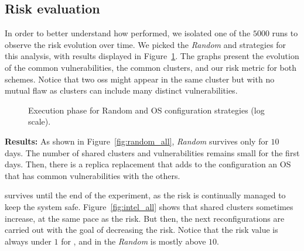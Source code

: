 \subsection*{Risk evaluation}


In order to better understand how \system performed, we isolated one of the $5000$ runs to observe the risk evolution over time. 
We picked the \emph{Random} and \system strategies for this analysis, with results displayed in Figure~\ref{fig:run_all}. 
The graphs present the evolution of the common vulnerabilities, the common clusters, and our risk metric for both schemes. 
Notice that two \glspl{os} might appear in the same cluster but with no mutual flaw as clusters can include many distinct vulnerabilities.

\begin{figure}[h]
\hspace{0.5cm}
\caption{Execution phase for Random and \system OS configuration strategies (log scale).}
\label{fig:run_all}
\end{figure}

\textbf{Results:} As shown in Figure~\ref{fig:random_all}, \emph{Random} survives only for $10$ days. 
The number of shared clusters and vulnerabilities remains small for the first days. 
Then, there is a replica replacement that adds to the configuration an OS that has common vulnerabilities with the others. 

\system survives until the end of the experiment, as the risk is continually managed to keep the system safe. Figure~\ref{fig:intel_all} shows that shared clusters sometimes increase, at the same pace as the risk.
But then, the next reconfigurations are carried out with the goal of decreasing the risk. 
Notice that the risk value is always under $1$ for \system, and in the \emph{Random} is mostly above $10$.


